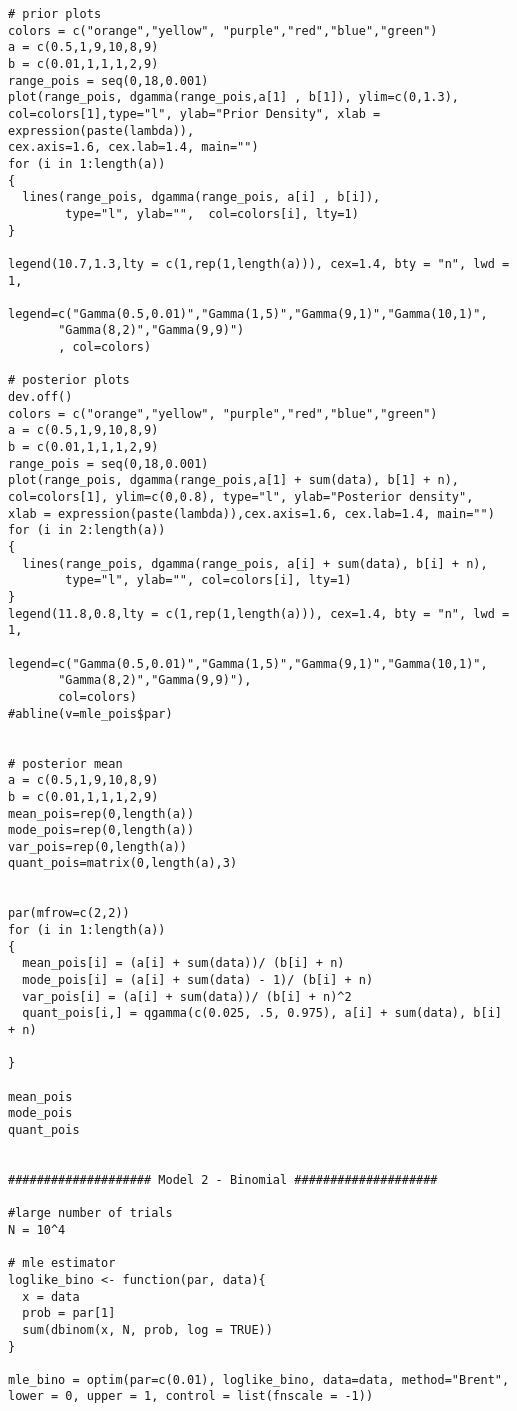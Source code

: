 \documentclass[a4paper, 11pt]{article}
\begin{document}
\begin{verbatim}
# prior plots
colors = c("orange","yellow", "purple","red","blue","green")
a = c(0.5,1,9,10,8,9)
b = c(0.01,1,1,1,2,9)
range_pois = seq(0,18,0.001)
plot(range_pois, dgamma(range_pois,a[1] , b[1]), ylim=c(0,1.3), 
col=colors[1],type="l", ylab="Prior Density", xlab = expression(paste(lambda)),
cex.axis=1.6, cex.lab=1.4, main="")
for (i in 1:length(a))
{
  lines(range_pois, dgamma(range_pois, a[i] , b[i]), 
        type="l", ylab="",  col=colors[i], lty=1)
}

legend(10.7,1.3,lty = c(1,rep(1,length(a))), cex=1.4, bty = "n", lwd = 1, 
       legend=c("Gamma(0.5,0.01)","Gamma(1,5)","Gamma(9,1)","Gamma(10,1)",
       "Gamma(8,2)","Gamma(9,9)")
       , col=colors)

# posterior plots
dev.off()
colors = c("orange","yellow", "purple","red","blue","green")
a = c(0.5,1,9,10,8,9)
b = c(0.01,1,1,1,2,9)
range_pois = seq(0,18,0.001)
plot(range_pois, dgamma(range_pois,a[1] + sum(data), b[1] + n), 
col=colors[1], ylim=c(0,0.8), type="l", ylab="Posterior density", 
xlab = expression(paste(lambda)),cex.axis=1.6, cex.lab=1.4, main="")
for (i in 2:length(a))
{
  lines(range_pois, dgamma(range_pois, a[i] + sum(data), b[i] + n), 
        type="l", ylab="", col=colors[i], lty=1)
}
legend(11.8,0.8,lty = c(1,rep(1,length(a))), cex=1.4, bty = "n", lwd = 1, 
       legend=c("Gamma(0.5,0.01)","Gamma(1,5)","Gamma(9,1)","Gamma(10,1)",
       "Gamma(8,2)","Gamma(9,9)"), 
       col=colors)
#abline(v=mle_pois$par)


# posterior mean 
a = c(0.5,1,9,10,8,9)
b = c(0.01,1,1,1,2,9)
mean_pois=rep(0,length(a))
mode_pois=rep(0,length(a))
var_pois=rep(0,length(a))
quant_pois=matrix(0,length(a),3)


par(mfrow=c(2,2))
for (i in 1:length(a))
{
  mean_pois[i] = (a[i] + sum(data))/ (b[i] + n)
  mode_pois[i] = (a[i] + sum(data) - 1)/ (b[i] + n)
  var_pois[i] = (a[i] + sum(data))/ (b[i] + n)^2
  quant_pois[i,] = qgamma(c(0.025, .5, 0.975), a[i] + sum(data), b[i] + n)
  
}

mean_pois
mode_pois
quant_pois


#################### Model 2 - Binomial ####################

#large number of trials
N = 10^4

# mle estimator
loglike_bino <- function(par, data){
  x = data
  prob = par[1]
  sum(dbinom(x, N, prob, log = TRUE))
}

mle_bino = optim(par=c(0.01), loglike_bino, data=data, method="Brent", 
lower = 0, upper = 1, control = list(fnscale = -1))


\end{verbatim}
\end{document}
